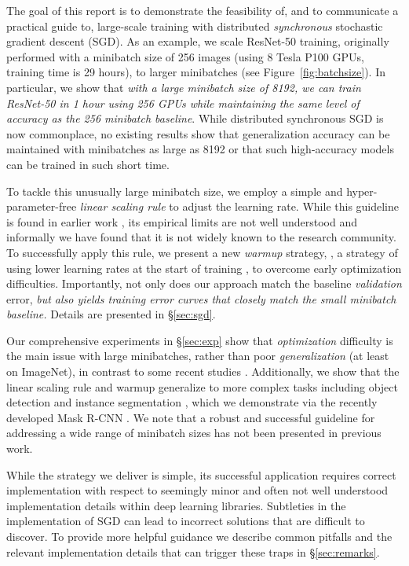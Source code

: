 \documentclass[10pt,twocolumn,letterpaper]{article}
\begin{document}
The goal of this report is to demonstrate the feasibility of, and to communicate a practical guide to, large-scale training with distributed \emph{synchronous} stochastic gradient descent (SGD). As an example, we scale ResNet-50 \cite{He2016} training, originally performed with a minibatch size of 256 images (using 8 Tesla P100 GPUs, training time is 29 hours), to larger minibatches (see Figure~\ref{fig:batchsize}). In particular, we show that \emph{with a large minibatch size of 8192, we can train ResNet-50 in 1 hour using 256 GPUs while maintaining the same level of accuracy as the 256 minibatch baseline}. While distributed synchronous SGD is now commonplace, no existing results show that generalization accuracy can be maintained with minibatches as large as 8192 or that such high-accuracy models can be trained in such short time.

To tackle this unusually large minibatch size, we employ a simple and hyper-parameter-free \emph{linear scaling rule} to adjust the learning rate. While this guideline is found in earlier work \cite{Krizhevsky2014,Bottou2016}, its empirical limits are not well understood and informally we have found that it is not widely known to the research community. To successfully apply this rule, we present a new \emph{warmup} strategy, \ie, a strategy of using lower learning rates at the start of training \cite{He2016}, to overcome early optimization difficulties. Importantly, not only does our approach match the baseline \emph{validation} error, \emph{but also yields training error curves that closely match the small minibatch baseline.} Details are presented in \S\ref{sec:sgd}.

Our comprehensive experiments in \S\ref{sec:exp} show that \emph{optimization} difficulty is the main issue with large minibatches, rather than poor \emph{generalization} (at least on ImageNet), in contrast to some recent studies \cite{Keskar2017}. Additionally, we show that the linear scaling rule and warmup generalize to more complex tasks including object detection and instance segmentation \cite{Girshick2015,Ren2015,He2017,Long2015}, which we demonstrate via the recently developed Mask R-CNN \cite{He2017}. We note that a robust and successful guideline for addressing a wide range of minibatch sizes has not been presented in previous work.

While the strategy we deliver is simple, its successful application requires correct implementation with respect to seemingly minor and often not well understood implementation details within deep learning libraries. Subtleties in the implementation of SGD can lead to incorrect solutions that are difficult to discover. To provide more helpful guidance we describe common pitfalls and the relevant implementation details that can trigger these traps in \S\ref{sec:remarks}.
\end{document}
